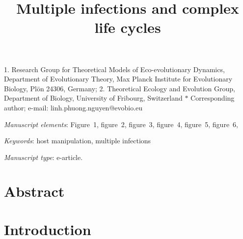 \documentclass[11pt]{article}
\title{Multiple infections and complex life cycles}
\author{}
\date{}
\begin{document}
\maketitle

\noindent{} 1. Research Group for Theoretical Models of Eco-evolutionary Dynamics, Department of Evolutionary Theory, Max Planck Institute for Evolutionary Biology, Pl\"{o}n 24306, Germany;
%
\noindent{} 2. Theoretical Ecology and Evolution Group, Department of Biology, University of Fribourg, Switzerland
%
\noindent{} $\ast$ Corresponding author; e-mail: linh.phuong.nguyen@evobio.eu

\bigskip

\textit{Manuscript elements}:  Figure~1, figure~2, figure~3, figure~4, figure~5, figure~6, %

\bigskip

\textit{Keywords}: host manipulation, multiple infections


\bigskip

\textit{Manuscript type}: e-article. %

\bigskip



\newpage{}

\section*{Abstract}



\newpage{}

\section*{Introduction}

\end{document}
